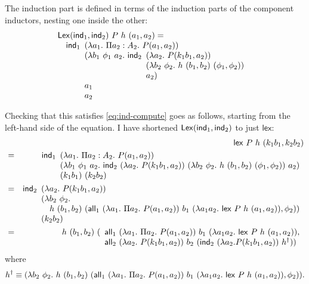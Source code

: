 \documentclass{amsart}
\begin{document}
The induction part is defined in terms of the induction parts of the
component inductors, nesting one inside the other:
\begin{displaymath}
  \begin{array}[t]{l}
    \mathsf{Lex}(\mathsf{ind}_1,\mathsf{ind}_2)\ P\ h\ (a_1,a_2) = \\
    \quad \mathsf{ind}_1
    \begin{array}[t]{l}
      (\lambda a_1.\ \Pi a_2 : A_2.\ P(a_1,a_2)) \\
      (\lambda b_1\ \phi_1\ a_2.\ \mathsf{ind}_2
      \begin{array}[t]{l}
        (\lambda a_2.\ P(k_1 b_1, a_2)) \\
        (\lambda b_2\ \phi_2.\ h\ (b_1, b_2)\ (\phi_1, \phi_2)) \\
        a_2)
      \end{array} \\
      a_1 \\
      a_2
    \end{array}
  \end{array}
\end{displaymath}

Checking that this satisfies \autoref{eq:ind-compute} goes as follows,
starting from the left-hand side of the equation. I have shortened
$\mathsf{Lex}(\mathsf{ind}_1, \mathsf{ind}_2)$ to just $\mathsf{lex}$:
\begin{eqnarray*}
  & & \mathsf{lex}\ P\ h\ (k_1b_1,k_2b_2)
  \\
  &=&
  \ind_1
  \begin{array}[t]{l}
    (\lambda a_1.\ \Pi a_2 : A_2.\ P(a_1,a_2)) \\
    (\lambda b_1\ \phi_1\ a_2.\ \ind_2\ (\lambda a_2.\ P(k_1 b_1, a_2))\ (\lambda b_2\ \phi_2.\ h\ (b_1, b_2)\ (\phi_1, \phi_2))\ a_2) \\
    (k_1 b_1)\ (k_2 b_2)
  \end{array}
  \\
  &=&
  \ind_2
  \begin{array}[t]{l}
    (\lambda a_2.\ P(k_1 b_1, a_2)) \\
    (\lambda b_2\ \phi_2.\ \\
    \quad h\ (b_1,b_2)\ (\all_1\ (\lambda a_1.\ \Pi a_2.\ P(a_1,a_2))\ b_1\ (\lambda a_1 a_2.\ \mathsf{lex}\ P\ h\ (a_1,a_2)), \phi_2)) \\
    (k_2 b_2)
  \end{array}
  \\
  &=&
  h\ (b_1,b_2)\ (
  \begin{array}[t]{l}
    \all_1\ (\lambda a_1.\ \Pi a_2.\ P(a_1,a_2))\ b_1\ (\lambda a_1 a_2.\ \mathsf{lex}\ P\ h\ (a_1,a_2)), \\
    \all_2\ (\lambda a_2.\ P(k_1 b_1, a_2))\ b_2\ (\ind_2\ (\lambda a_2. P(k_1 b_1, a_2))\ h^\dagger))
  \end{array}
\end{eqnarray*}
where
\begin{displaymath}
  h^\dagger \equiv (\lambda b_2\ \phi_2.\ h\ (b_1,b_2)\ (\mathsf{all}_1\
  (\lambda a_1.\ \Pi a_2.\ P(a_1,a_2))\ b_1\ (\lambda a_1 a_2.\
  \mathsf{lex}\ P\ h\ (a_1,a_2)), \phi_2)).
\end{displaymath}
\end{document}
